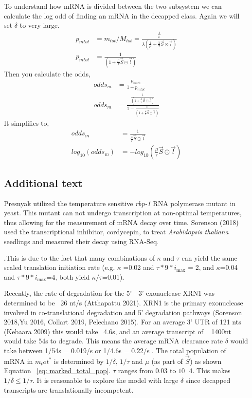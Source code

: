 \documentclass[review]{elsarticle}
\newcommand{\imax}{\ensuremath{{i_{\max}}}\xspace}
\begin{document}
To understand how mRNA is divided  between the two subsystem we can calculate the log odd of finding an mRNA in the decapped class. Again we will set $\delta$ to very large.
\begin{align*}
	p_{mtot} &= m_{tot}/M_{tot} = \frac{\frac{\lambda}{\mu}}{\lambda(\frac{1}{\mu} + \frac{1}{\tau}\vec{S} \odot \vec{l})}	\\
	p_{mtot} &= \frac{1}{(1  + \frac{\mu}{\tau}\vec{S} \odot \vec{l})}	
\end{align*}
Then you calculate the odds,
\begin{align}
	odds_{m}& = \frac{p_{mtot}}{1-p_{mtot}}\\
	odds_{m} &= \frac{\frac{1}{(1  + \frac{\mu}{\tau}\vec{S} \odot \vec{l})}}{1-\frac{1}{(1  + \frac{\mu}{\tau}\vec{S} \odot \vec{l})}}
\end{align}
It simplifies to,
\begin{align}
	odds_{m} &= \frac{1}{\frac{\mu}{\tau}\vec{S} \odot \vec{l}} \\
	log_{10}(odds_{m}) &= -log_{10}(\frac{\mu}{\tau}\vec{S} \odot \vec{l}) 
\end{align}


\subsection{Additional text}
 Presnyak utilized the temperature sensitive \textit{rbp-1} RNA polymerase mutant in yeast. This mutant can not undergo transcription at non-optimal temperatures, thus allowing for the measurement of mRNA decay over time. Sorenson (2018) used the transcriptional inhibitor, cordycepin, to treat  \textit{Arabidopsis thaliana} seedlings and measured their decay using RNA-Seq.

.This is due to the fact that many combinations of $\kappa$ and $\tau$ can yield the same scaled translation initiation rate (e.g. $\kappa$ =0.02 and $\tau*9*\imax$ = 2, and $\kappa$=0.04 and $\tau*9*\imax$=4, both yield $\kappa/\tau$=0.01).


	
 Recently, the rate of degradation for the 5' - 3' exonuclease XRN1 was determined to be ~26 nt/s (Atthapattu 2021). XRN1 is the primary exonuclease involved in co-translational degradation and  5' degradation pathways (Sorenson 2018,Yu 2016, Collart 2019, Pelechano 2015). For an average 3' UTR of 121 nts (Kebaara 2009) this would take ~4.6s, and an average transcript of ~ 1400nt would take 54s to degrade.  This means the average mRNA clearance rate $\delta$ would take between 1/54s = 0.019/s or 1/4.6s = 0.22/s . The total population of mRNA in $m_tot^*$ is determined by $1/\delta$, $1/\tau$ and $\mu$ (as part of $\vec{S}$) as shown Equation  ~\ref{eq:  marked_total_pop}. $\tau$ ranges from 0.03 to $10^-4$. This makes $1/\delta \leq 1/\tau$. It is reasonable to explore the model with large $\delta$ since decapped transcripts are translationally incompetent. 
\end{document}
